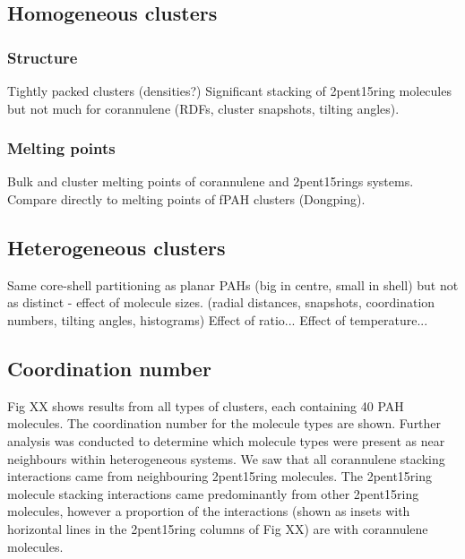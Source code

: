 


\subsection{Homogeneous clusters}
\subsubsection{Structure}
Tightly packed clusters (densities?)
Significant stacking of 2pent15ring molecules but not much for corannulene (RDFs, cluster snapshots, tilting angles).



\subsubsection{Melting points}
Bulk and cluster melting points of corannulene and 2pent15rings systems.
Compare directly to melting points of fPAH clusters (Dongping).


\subsection{Heterogeneous clusters}
Same core-shell partitioning as planar PAHs (big in centre, small in shell) but not as distinct - effect of molecule sizes. (radial distances, snapshots, coordination numbers, tilting angles, histograms)
Effect of ratio...
Effect of temperature...


\subsection{Coordination number}
Fig XX shows results from all types of clusters, each containing 40 PAH molecules.  The coordination number for the molecule types are shown.  Further analysis was conducted to determine which molecule types were present as near neighbours within heterogeneous systems.  We saw that all corannulene stacking interactions came from neighbouring 2pent15ring molecules.  The 2pent15ring molecule stacking interactions came predominantly from other 2pent15ring molecules, however a proportion of the interactions (shown as insets with horizontal lines in the 2pent15ring columns of Fig XX) are with corannulene molecules.

